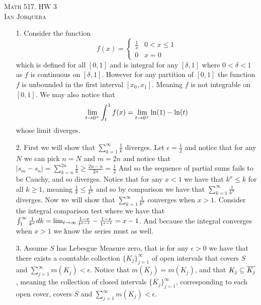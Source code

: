 \documentclass[12pt]{amsart}
\begin{document}
\begin{center}
   \textsc{Math 517. HW 3\\ Ian Jorquera}
\end{center}
\vspace{1em}

\begin{itemize}
   \item[1.]
      Consider the function
      \[ f(x)= \begin{cases}
            \frac{1}{x} & 0<x\leq 1 \\
            0           & x=0
         \end{cases}\]
      which is defined for all $[0,1]$ and is integral for any $[\delta,1]$ where
      $0<\delta<1$ as $f$ is continuous on $[\delta,1]$. However for any partition of
      $[0,1]$ the function $f$ is unbounded in the first interval $[x_0,x_1]$.
      Meaning $f$ is not integrable on $[0,1]$. We may also notice that
      \[\lim_{t\rightarrow 0^+}\int_{t}^1f(x)=\lim_{t\rightarrow 0^+}\ln(1)-\ln(t)\]
      whose limit diverges.

   \item[2.] First we will show that $\sum_{k=1}^\infty\frac{1}{k}$ diverges.
      Let $\epsilon=\frac{1}{2}$
      and notice that for any $N$ we can pick $n=N$ and $m=2n$ and notice that $|s_m-s_n|=\sum_{k=n}^{2n}\frac{1}{k}\geq \frac{2n-n}{2n}=\frac{1}{2}$
      And so the sequence of partial sums fails to be Cauchy, and so diverges.
      Notice that for any $x<1$ we have that $k^x\leq k$ for all $k\geq 1$, meaning $\frac{1}{k} \leq \frac{1}{k^x}$
      and so by comparison we have that $\sum_{k=1}^\infty\frac{1}{k^x}$ diverges.
      Now we will show that $\sum_{k=1}^\infty\frac{1}{k^x}$ converges when $x>1$.
      Consider the integral comparison test where we have that $\int_1^\infty\frac{1}{k^x}dk=\lim_{t\rightarrow \infty}\frac{1-x}{t^{x-1}}-\frac{1-x}{1^{x-1}}=x-1$.
      And because the integral converges when $x>1$ we know the series must as well.

   \item[3.] Assume $S$ has Lebesgue Measure zero, that is for any $\epsilon>0$ we have that there exists a
             countable collection $\{K_j\}_{j=1}^\infty$ of open intervals that covers $S$ and $\sum_{j=1}^\infty m(K_j)<\epsilon$.
             Notice that $m(\overline{K_j})=m(K_j)$, and that $K_j\subseteq \overline{K_j}$, meaning the collection of closed intervals
             $\{\overline{K_j}\}_{j=1}^\infty$, corresponding to each open cover, covers $S$ and 
             $\sum_{j=1}^\infty m(\overline{K_j})<\epsilon$.


\end{itemize}
\end{document}
